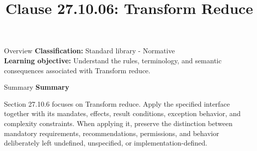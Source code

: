 \documentclass[10pt,letterpaper]{article}
\title{Clause 27.10.06: Transform Reduce}
\author{}
\date{}
\begin{document}
\maketitle
\begin{CornellOverviewBox}{Overview}
\textbf{Classification:} Standard library - Normative\\[2pt]
\textbf{Learning objective:} Understand the rules, terminology, and semantic consequences associated with Transform reduce.
\end{CornellOverviewBox}\begin{CornellSummaryBox}{Summary}
{\sffamily\bfseries\color{Accent} Summary}\par\vspace{3pt}Section 27.10.6 focuses on Transform reduce. Apply the specified interface together with its mandates, effects, result conditions, exception behavior, and complexity constraints. When applying it, preserve the distinction between mandatory requirements, recommendations, permissions, and behavior deliberately left undefined, unspecified, or implementation-defined.
\end{CornellSummaryBox}
\end{document}
